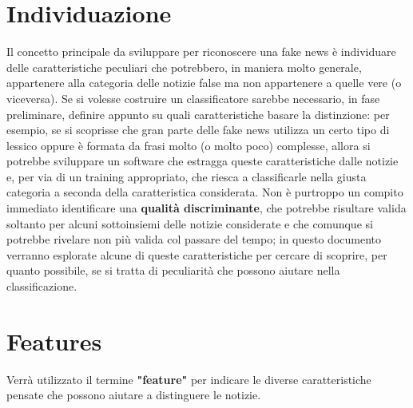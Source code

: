 \documentclass{article}
\begin{document}
    \begin{multicols}{2}
			\section{Individuazione}
			Il concetto principale da sviluppare per riconoscere una fake news è individuare delle caratteristiche peculiari che potrebbero, in maniera molto generale, appartenere alla categoria delle notizie false ma non appartenere a quelle vere (o viceversa). Se si volesse costruire un classificatore sarebbe necessario, in fase preliminare, definire appunto su quali caratteristiche basare la distinzione: per esempio, se si scoprisse che gran parte delle fake news utilizza un certo tipo di lessico oppure è formata da frasi molto (o molto poco) complesse, allora si potrebbe sviluppare un software che estragga queste caratteristiche dalle notizie e, per via di un training appropriato, che riesca a classificarle nella giusta categoria a seconda della caratteristica considerata.
			Non è purtroppo un compito immediato identificare una \textbf{qualità discriminante}, che potrebbe risultare valida soltanto per alcuni sottoinsiemi delle notizie considerate e che comunque si potrebbe rivelare non più valida col passare del tempo; in questo documento verranno esplorate alcune di queste caratteristiche per cercare di scoprire, per quanto possibile, se si tratta di peculiarità che possono aiutare nella classificazione.
	    
	    \section{Features}
		    Verrà utilizzato il termine \textbf{"feature"} per indicare le diverse caratteristiche pensate che possono aiutare a distinguere le notizie.
		    

\end{multicols}
\end{document}

